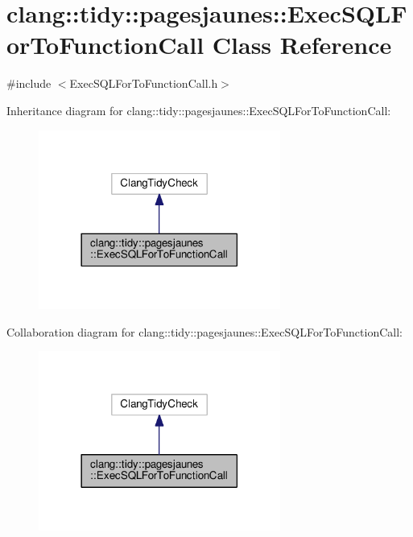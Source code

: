 \hypertarget{classclang_1_1tidy_1_1pagesjaunes_1_1_exec_s_q_l_for_to_function_call}{}\section{clang\+:\+:tidy\+:\+:pagesjaunes\+:\+:Exec\+S\+Q\+L\+For\+To\+Function\+Call Class Reference}
\label{classclang_1_1tidy_1_1pagesjaunes_1_1_exec_s_q_l_for_to_function_call}


{\ttfamily \#include $<$Exec\+S\+Q\+L\+For\+To\+Function\+Call.\+h$>$}



Inheritance diagram for clang\+:\+:tidy\+:\+:pagesjaunes\+:\+:Exec\+S\+Q\+L\+For\+To\+Function\+Call\+:
\nopagebreak
\begin{figure}[H]
\begin{center}
\leavevmode
\includegraphics[width=225pt]{classclang_1_1tidy_1_1pagesjaunes_1_1_exec_s_q_l_for_to_function_call__inherit__graph}
\end{center}
\end{figure}


Collaboration diagram for clang\+:\+:tidy\+:\+:pagesjaunes\+:\+:Exec\+S\+Q\+L\+For\+To\+Function\+Call\+:
\nopagebreak
\begin{figure}[H]
\begin{center}
\leavevmode
\includegraphics[width=225pt]{classclang_1_1tidy_1_1pagesjaunes_1_1_exec_s_q_l_for_to_function_call__coll__graph}
\end{center}
\end{figure}
